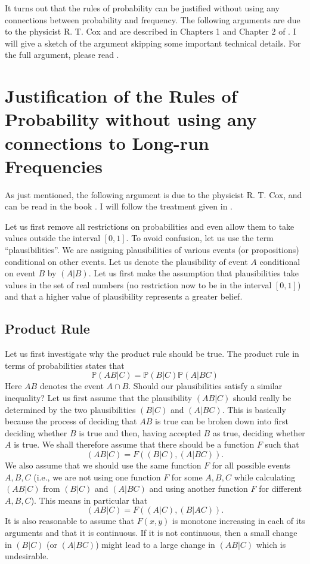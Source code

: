 \documentclass{scrartcl}
\renewcommand{\P}{{\mathbb P}}
\begin{document}
It turns out that the rules of probability can be justified without
using any connections between probability and frequency. The following
arguments are due to the physicist R. T. Cox and are described in Chapters 1 and
Chapter 2 of \citet{Jaynes}. I will give a sketch of the argument
skipping some important technical details. For the full argument,
please read \citet[Chapter 1 and 2]{Jaynes}.

\section{Justification of the Rules of Probability without using any
  connections to Long-run Frequencies}
As just mentioned, the following argument is due to the physicist
R. T. Cox, and can be read in the book \citet{rtcox}. I will follow
the treatment given in \citet[Chapter 1 and 2]{Jaynes}. 


Let us first remove all restrictions on probabilities and even allow
them to take values outside the interval $[0, 1]$. To avoid confusion,
let us use the term ``plausibilities''. We are assigning
plausibilities of various events (or propositions) conditional on
other events. Let us denote the plausibility of event $A$ conditional
on event $B$ by $(A|B)$. Let us first make the assumption that
plausibilities take values in the set of real numbers (no restriction
now to be in the interval $[0, 1]$) and that a higher value of
plausibility represents a greater belief.

\subsection{Product Rule}
Let us first investigate why the product rule should be true. The
product rule in terms of probabilities states that
\begin{equation*}
  \P(AB|C) = \P(B|C) \P(A|BC)
\end{equation*}
Here $AB$ denotes the event $A \cap B$. Should our plausibilities
satisfy a similar inequality? Let us first assume that the
plausibility $(AB|C)$ should really be determined  by the two
plausibilities $(B|C)$ and $(A|BC)$. This is basically because the
process of deciding that $AB$  is true can be broken down into first
deciding whether $B$ is true and then, having accepted $B$ as true,
deciding whether $A$ is true. We shall therefore assume that there
should be a function $F$ such that
\begin{equation*}
  (AB|C) = F((B|C), (A|BC)). 
\end{equation*}
We also assume that we should use the same function $F$ for all
possible events $A, B, C$ (i.e., we are not using one function $F$ for
some $A, B, C$ while calculating $(AB|C)$ from $(B|C)$ and $(A|BC)$
and using another function $F$ for different $A, B, C$). This means in
particular that
\begin{equation*}
  (AB|C) = F((A|C), (B|AC)). 
\end{equation*}
It is also reasonable to assume that $F(x, y)$ is monotone increasing
in each of its arguments and that it is continuous. If it is not
continuous, then a small change in $(B|C)$ (or $(A|BC)$) might lead to
a large change in $(AB|C)$ which is undesirable.
\end{document}
